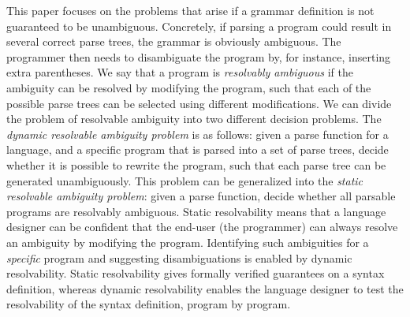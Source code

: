 \documentclass[runningheads]{llncs}
\begin{document}
This paper focuses on the problems that arise if a grammar definition
is not guaranteed to be unambiguous. Concretely, if parsing a program
could result in several correct parse trees, the grammar is obviously
ambiguous. The programmer then needs to disambiguate the program by,
for instance, inserting extra parentheses. We say that a program is
\emph{resolvably ambiguous} if the ambiguity can be resolved by
modifying the program, such that each of the possible parse trees can
be selected using different modifications.
%
We can divide the problem of resolvable ambiguity into two
different decision problems.
%
The \emph{dynamic resolvable ambiguity problem} is as follows:
given a parse function for a language, and a specific program that
is parsed into a set of parse trees, decide whether it is possible to
rewrite the program, such that each parse tree can be generated
unambiguously.
%
This problem can be generalized into the \emph{static resolvable
  ambiguity problem}: given a parse function, decide whether all
parsable programs are resolvably ambiguous.
%
Static resolvability means that a language designer can be
confident that the end-user (the programmer) can always resolve an
ambiguity by modifying the program. Identifying such ambiguities
for a \emph{specific} program and suggesting disambiguations is
enabled by dynamic resolvability.
%
Static resolvability gives formally verified guarantees on a
syntax definition, whereas dynamic resolvability enables the
language designer to test the resolvability of the syntax
definition, program by program.





\end{document}
